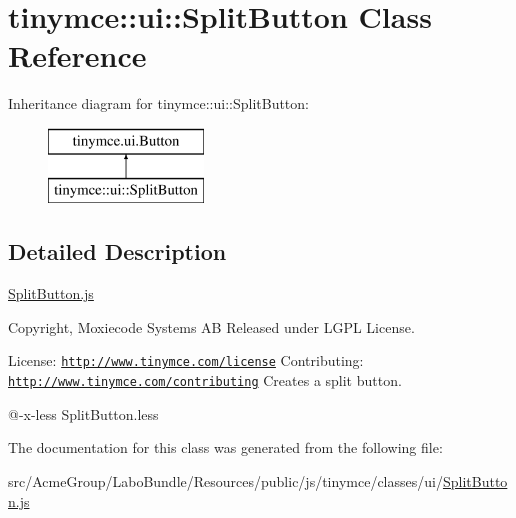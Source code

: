 \hypertarget{classtinymce_1_1ui_1_1_split_button}{\section{tinymce\+:\+:ui\+:\+:Split\+Button Class Reference}
\label{classtinymce_1_1ui_1_1_split_button}
}
Inheritance diagram for tinymce\+:\+:ui\+:\+:Split\+Button\+:\begin{figure}[H]
\begin{center}
\leavevmode
\includegraphics[height=2.000000cm]{classtinymce_1_1ui_1_1_split_button}
\end{center}
\end{figure}


\subsection{Detailed Description}
\hyperlink{_split_button_8js}{Split\+Button.\+js}

Copyright, Moxiecode Systems A\+B Released under L\+G\+P\+L License.

License\+: \href{http://www.tinymce.com/license}{\tt http\+://www.\+tinymce.\+com/license} Contributing\+: \href{http://www.tinymce.com/contributing}{\tt http\+://www.\+tinymce.\+com/contributing} Creates a split button.

@-\/x-\/less Split\+Button.\+less 

The documentation for this class was generated from the following file\+:\begin{DoxyCompactItemize}
\item 
src/\+Acme\+Group/\+Labo\+Bundle/\+Resources/public/js/tinymce/classes/ui/\hyperlink{_split_button_8js}{Split\+Button.\+js}\end{DoxyCompactItemize}
